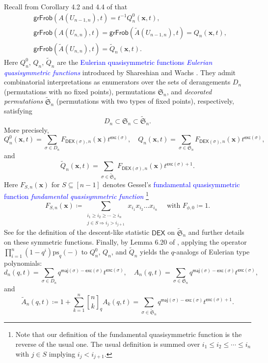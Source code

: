 \documentclass[reqno]{amsart}
\newcommand{\defin}[1]{%
\relax\ifmmode%
\textcolor{blue}{#1}%
\else\textcolor{blue}{\emph{#1}}%
\fi%
}
\newcommand{\exc}{{\mathsf{exc}}}
\newcommand{\maj}{{\mathsf{maj}}}
\newcommand{\DEX}{{\mathsf{DEX}}}
\newcommand{\ps}{{\mathrm{ps}_q}}
\renewcommand{\S}{{\mathfrak{S}}}
\newcommand{\x}{{\mathbf{x}}}
\newcommand{\grFrob}{{\mathsf{grFrob}}}
\newcommand{\qbin}[2]{{#1 \brack #2}_q} %
\theoremstyle{definition}
\theoremstyle{remark}
\begin{document}
Recall from Corollary 4.2 and 4.4 of \cite{Liao2023Two} that
\begin{align}
    &\grFrob(A(U_{n-1,n}),t)=t^{-1}Q_n^0(\x,t),     \label{eq:Derangements}\\
    &\grFrob(A(U_{n,n}),t)=\grFrob(\widetilde{A}(U_{n-1,n}),t)=Q_n(\x,t), \label{eq:Permutations}\\
    &\grFrob(\widetilde{A}(U_{n,n}),t)=\widetilde{Q}_n(\x,t).  \label{eq:DecoratedPerms} 
\end{align}
Here $Q_n^0$, $Q_n$, $\widetilde{Q}_n$ are the \defin{Eulerian quasisymmetric functions} introduced by Shareshian and Wachs \cite{ShareshianWachs2010, ShareshianWachs2020}.
They admit combinatorial interpretations as enumerators over the sets of derangements $D_n$ (permutations with no fixed points), permutations $\mathfrak{S}_n$, and \emph{decorated permutations} $\widetilde{\mathfrak{S}}_n$ (permutations with two types of fixed points), respectively, satisfying
\[
D_n \subset \mathfrak{S}_n \subset \widetilde{\mathfrak{S}}_n.
\]
More precisely,
\begin{equation} \label{eq:InterpDerEulerQuas}
    Q_n^0(\x,t)=\sum_{\sigma\in D_n}F_{\DEX(\sigma),n}(\x)t^{\exc(\sigma)}, \quad Q_n(\x,t)=\sum_{\sigma\in \S_n}F_{\DEX(\sigma),n}(\x)t^{\exc(\sigma)},
\end{equation}
and
\begin{equation} \label{eq:InterpBinomEulerQuas}
    \widetilde{Q}_n(\x,t)=\sum_{\sigma\in\widetilde{\S}_n}F_{\DEX(\sigma),n}(\x)t^{\exc(\sigma)+1}.
\end{equation}
Here $F_{S,n}(\x)$ for $S\subseteq[n-1]$ denotes Gessel's \defin{fundamental quasisymmetric function} \footnote{Note that our definition of the fundamental quasisymmetric function is the reverse of the usual one. The usual definition is summed over $i_1\le i_2\le\cdots\le i_n$ with $j\in S$ implying $i_j<i_{j+1}$.}
\[
    F_{S,n}(\x)\coloneqq \sum_{\substack{i_1\ge i_2\ge \cdots\ge i_n\\ j\in S\Rightarrow i_j>i_{j+1}}}x_{i_1}x_{i_2}\ldots x_{i_n}
    \quad \text{ with }F_{\phi,0}\coloneqq 1.
\] 
See \cite{Liao2023Two} for the definition of the descent-like statistic $\DEX$ on $\widetilde{\mathfrak{S}}_n$ and further details on these symmetric functions. 
Finally, by Lemma 6.20 of \cite{Liao2023One}, applying the operator $\prod_{i=1}^n(1-q^i)\ps(-)$ to $Q_n^0$, $Q_n$, and $\widetilde{Q}_n$ yields the $q$-analogs of Eulerian type polynomials:
\[
    d_n(q,t)=\sum_{\sigma\in D_n}q^{\maj(\sigma)-\exc(\sigma)}t^{\exc(\sigma)}, \quad A_n(q,t)=\sum_{\sigma\in \S_n}q^{\maj(\sigma)-\exc(\sigma)}t^{\exc(\sigma)},
\]
and 
\[
    \widetilde{A}_n(q,t)\coloneqq 1+\sum_{k=1}^n\qbin{n}{k}A_k(q,t) =\sum_{\sigma\in \widetilde{\S}_n}q^{\maj(\sigma)-\exc(\sigma)}t^{\exc(\sigma)+1}.
\]
\end{document}
